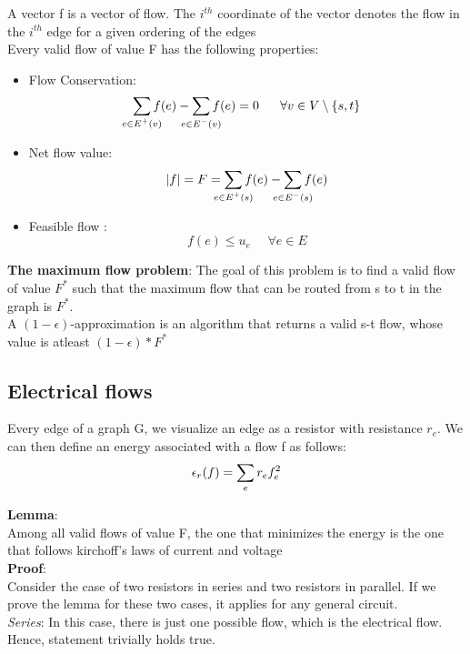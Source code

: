 \documentclass[a4paper,10pt]{article}
\newcommand{\eps}{\epsilon}
\begin{document}
    A vector f is a vector of flow. The $i^{th}$ coordinate of the vector denotes the flow in the $i^{th}$ edge for a given ordering of the 
    edges \\
    
    Every valid flow of value F has the following properties: 
    \begin{itemize}
    \item 
      Flow Conservation: $$\sum_{\mathclap{e \in E^+(v)}} f(e)- \sum_{\mathclap{e \in E^-(v)}} f(e) = 0 ~~~~~ \forall v \in V \setminus \{s,t\}$$
    \item
      Net flow value:
      $$|f| = F = \sum_{\mathclap{e \in E^+(s)}} f(e)- \sum_{\mathclap{e \in E^-(s)}} f(e)$$
    \item
      Feasible flow :
      $$f(e) \leq u_e ~~~~~~ \forall e \in E$$
    \end{itemize}
    
    \textbf{The maximum flow problem}: The goal of this problem is to find a valid flow of value $F^{\ast}$ such that the maximum flow that 
    can be routed from s to t in the graph is $F^{\ast}$. \\
    A $(1-\eps)$-approximation is an algorithm that returns a valid s-t flow, whose value
    is atleast $(1-\eps)\ast F^{\ast}$ 
    
    \subsection{Electrical flows}
      Every edge of a graph G, we visualize an edge as a resistor with resistance $r_e$. We can then define an energy associated with a flow f as
      follows: 
      $$\eps_r(f) = \sum_{\mathclap{e}}r_e f_{e}^{2}$$

      \textbf{Lemma}: \\
	Among all valid flows of value F, the one that minimizes the energy is the one that follows kirchoff's laws of current and voltage \\
	
      \textbf{Proof}: \\
	Consider the case of two resistors in series and two resistors in parallel. If we prove the lemma for these two cases, it applies for 
	any general circuit. \\
	
	\textit{Series}: In this case, there is just one possible flow, which is the electrical flow. Hence, statement trivially holds true. \\
	
\end{document}
